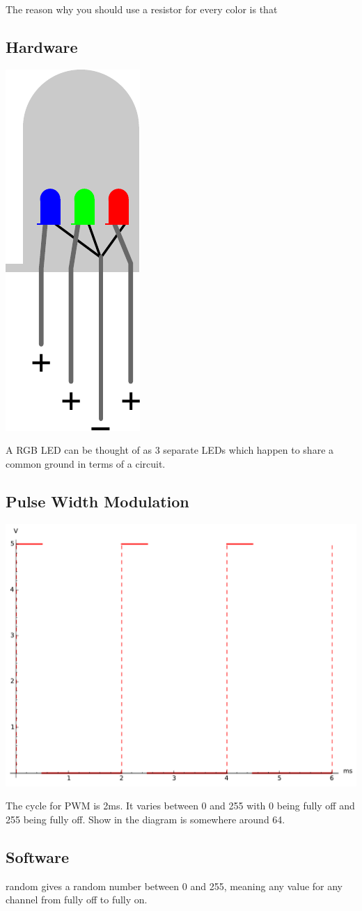The reason why you should use a resistor 
for every color is that 
\subsection{Hardware}

\begin{center}
    \includegraphics[height=0.2\textwidth]{./Graphics/rgb_internals}
\end{center}

A RGB LED can be thought of as 3 separate LEDs 
which happen to share a common ground 
in terms of a circuit.

\subsection{Pulse Width Modulation}
\begin{center}
    \includegraphics[height=0.4\textwidth]{./Graphics/pwd_mid}
\end{center}

The cycle for PWM is 2ms.
It varies between 0 and 255 
with 0 being fully off
and 255 being fully off.
Show in the diagram is somewhere around 64.

\subsection{Software}


random gives a random number between 0 and 255,
meaning any value for any channel from fully off
to fully on.
